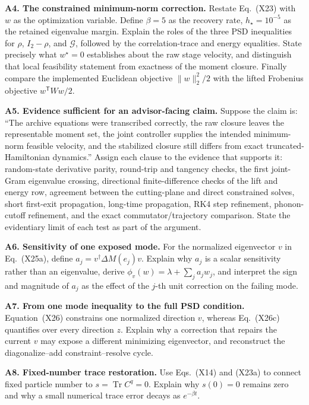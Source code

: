 \documentclass[10pt,letterpaper,twocolumn]{article}
\begin{document}
\textbf{A4. The constrained minimum-norm correction.}
Restate Eq.~(X23) with \(w\) as the optimization variable.  Define
\(\beta=5\) as the recovery rate, \(h_\star=10^{-5}\) as the retained
eigenvalue margin.  Explain the roles of the three PSD inequalities for
\(\rho\), \(I_2-\rho\),
and \(\mathcal G\), followed by the correlation-trace and energy equalities.
State precisely what \(w^\star=0\) establishes about the raw stage velocity,
and distinguish that local feasibility statement from exactness of the moment
closure.  Finally compare the implemented Euclidean objective
\(\lVert w\rVert_2^2/2\) with the lifted Frobenius objective
\(w^{\mathsf T}Ww/2\).

\textbf{A5. Evidence sufficient for an advisor-facing claim.}
Suppose the claim is: ``The archive equations were transcribed correctly, the
raw closure leaves the representable moment set, the joint controller supplies
the intended minimum-norm feasible velocity, and the stabilized closure still
differs from exact truncated-Hamiltonian dynamics.''  Assign each clause to
the evidence that supports it: random-state derivative parity, round-trip and
tangency checks, the first joint-Gram eigenvalue crossing, directional
finite-difference checks of the lift and energy row, agreement between the
cutting-plane and direct constrained solves, short first-exit propagation,
long-time propagation, RK4 step refinement, phonon-cutoff refinement, and the
exact commutator/trajectory comparison.  State the evidentiary limit of each
test as part of the argument.

\textbf{A6. Sensitivity of one exposed mode.}
For the normalized eigenvector \(v\) in Eq.~(X25a), define
\(a_j=v^\dagger\Delta M(e_j)v\).  Explain why \(a_j\) is a scalar sensitivity
rather than an eigenvalue, derive
\(\phi_v(w)=\lambda+\sum_j a_jw_j\), and interpret the sign and magnitude of
\(a_j\) as the effect of the \(j\)-th unit correction on the failing mode.

\textbf{A7. From one mode inequality to the full PSD condition.}
Equation~(X26) constrains one normalized direction \(v\), whereas
Eq.~(X26c) quantifies over every direction \(z\).  Explain why a correction
that repairs the current \(v\) may expose a different minimizing eigenvector,
and reconstruct the diagonalize--add constraint--resolve cycle.

\textbf{A8. Fixed-number trace restoration.}
Use Eqs.~(X14) and (X23a) to connect fixed particle number to
\(s=\operatorname{Tr}C^q=0\).  Explain why \(s(0)=0\) remains zero and why a
small numerical trace error decays as \(e^{-\beta t}\).
\end{document}
